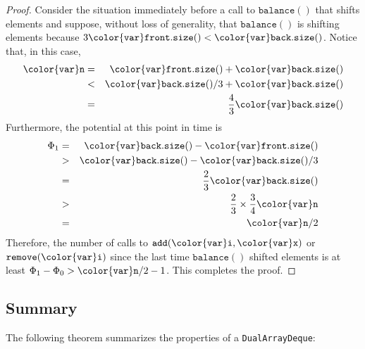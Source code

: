 \documentclass[10pt]{book}
\theoremstyle{plain}
\theoremstyle{definition}
\begin{document}
\begin{proof}
  Consider the situation immediately before a call to \ensuremath{\mathtt{balance()}} that
  shifts elements and suppose, without loss of generality, that \ensuremath{\mathtt{balance()}}
  is shifting elements because $3\ensuremath{\mathtt{{\color{var}front}.size()}} < \ensuremath{\mathtt{{\color{var}back}.size()}}$.
  Notice that, in this case,
  \begin{eqnarray*}
   \ensuremath{\mathtt{{\color{var}n}}} & = & \ensuremath{\mathtt{{\color{var}front}.size()}}+\ensuremath{\mathtt{{\color{var}back}.size()}} \\
       & < & \ensuremath{\mathtt{{\color{var}back}.size()}}/3+\ensuremath{\mathtt{{\color{var}back}.size()}} \\
       & = & \frac{4}{3}\ensuremath{\mathtt{{\color{var}back}.size()}}
  \end{eqnarray*}
  Furthermore, the potential at this point in time is
  \begin{eqnarray*}
  \Phi_1 & = & \ensuremath{\mathtt{{\color{var}back}.size()}} - \ensuremath{\mathtt{{\color{var}front}.size()}} \\
      &>& \ensuremath{\mathtt{{\color{var}back}.size()}} - \ensuremath{\mathtt{{\color{var}back}.size()}}/3 \\
      &=& \frac{2}{3}\ensuremath{\mathtt{{\color{var}back}.size()}} \\
      &>& \frac{2}{3}\times\frac{3}{4}\ensuremath{\mathtt{{\color{var}n}}} \\
      &=& \ensuremath{\mathtt{{\color{var}n}}}/2
  \end{eqnarray*}
  Therefore, the number of calls to \ensuremath{\mathtt{add({\color{var}i},{\color{var}x})}} or \ensuremath{\mathtt{remove({\color{var}i})}} since
  the last time \ensuremath{\mathtt{balance()}} shifted elements is at least $\Phi_1-\Phi_0
  > \ensuremath{\mathtt{{\color{var}n}}}/2-1$. This completes the proof.
\end{proof}

\subsection{Summary}

The following theorem summarizes the properties of a \texttt{DualArrayDeque}:
\end{document}
